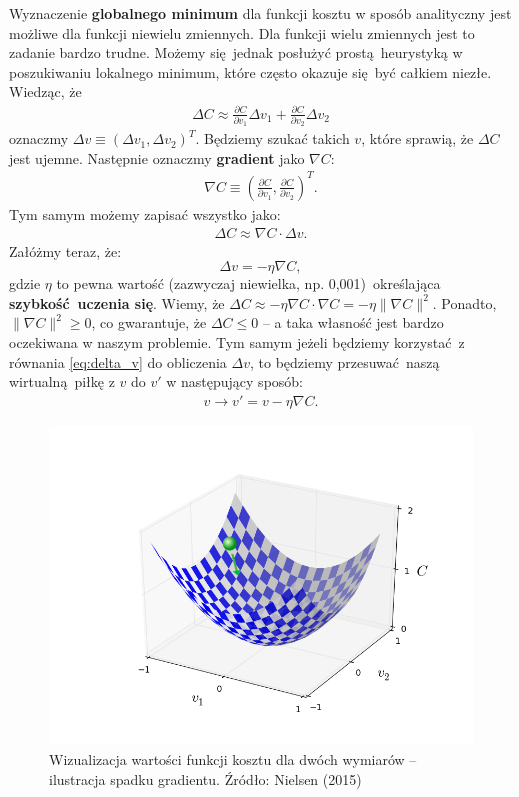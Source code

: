 \documentclass[10pt, oneside]{article}
\theoremstyle{remark}
\begin{document}
Wyznaczenie \textbf{globalnego minimum} dla funkcji kosztu w sposób analityczny jest możliwe dla funkcji niewielu zmiennych.
Dla funkcji wielu zmiennych jest to zadanie bardzo trudne.
Możemy się jednak posłużyć prostą heurystyką w poszukiwaniu lokalnego minimum, które często okazuje się być całkiem niezłe.
Wiedząc, że
\begin{eqnarray} 
  \Delta C \approx \frac{\partial C}{\partial v_1} \Delta v_1 +
  \frac{\partial C}{\partial v_2} \Delta v_2
\end{eqnarray}
oznaczmy $\Delta v \equiv (\Delta v_1, \Delta v_2)^T$.
Będziemy szukać takich $v$, które sprawią, że $\Delta C$ jest ujemne.
Następnie oznaczmy \textbf{gradient} jako $\nabla C$:
\begin{eqnarray} 
  \nabla C \equiv \left( \frac{\partial C}{\partial v_1}, 
  \frac{\partial C}{\partial v_2} \right)^T.
\end{eqnarray}
Tym samym możemy zapisać wszystko jako:
\begin{eqnarray} 
  \Delta C \approx \nabla C \cdot \Delta v.
\end{eqnarray}
Załóżmy teraz, że:
\begin{equation} 
  \Delta v = -\eta \nabla C,
  \label{eq:delta_v}
\end{equation}
gdzie $\eta$ to pewna wartość (zazwyczaj niewielka, np. 0,001) określająca \textbf{szybkość uczenia się}.
Wiemy, że $\Delta C \approx -\eta \nabla C \cdot \nabla C = -\eta \|\nabla C\|^2$. 
Ponadto, $\| \nabla C \|^2 \geq 0$, co gwarantuje, że $\Delta C \leq 0$ -- a taka własność jest bardzo oczekiwana w naszym problemie.
Tym samym jeżeli będziemy korzystać z równania \ref{eq:delta_v} do obliczenia $\Delta v$, to będziemy przesuwać naszą wirtualną piłkę z $v$ do $v'$ w następujący sposób:
\begin{eqnarray}
  v \rightarrow v' = v -\eta \nabla C.
\end{eqnarray}
\begin{figure}[!htpb]
	\centering
	\includegraphics[width=.7\linewidth]{figures/valley_with_ball}
	\caption{Wizualizacja wartości funkcji kosztu dla dwóch wymiarów -- ilustracja spadku gradientu. Źródło: Nielsen (2015)}
\end{figure}
\end{document}
